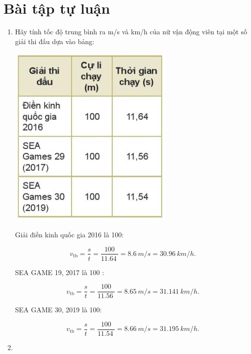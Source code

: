 \section{Bài tập tự luận}
\begin{enumerate}[label=\bfseries Bài \arabic*:]
	\item {}
	
	
	{
		Hãy tính tốc độ trung bình ra m/s và km/h của nữ vận động viên tại một số giải thi đấu dựa vào bảng:
		\begin{center}
			\includegraphics[scale=1]{../figs/VN10-2022-PH-TP005-5.jpg}
		\end{center}
	}
	\hideall
	{
		
		Giải điền kinh quốc  gia 2016 là 100:
		
		$$v_\text{tb} = \dfrac{s}{t} =\dfrac{100}{\SI{11,64}{}} = \SI{8,6}{m/s} = \SI{30,96}{km/h}.$$
		
		SEA GAME 19, 2017  là 100 : 
		
		$$v_\text{tb} = \dfrac{s}{t} =\dfrac{100}{\SI{11,56}{}} = \SI{8,65}{m/s} = \SI{31,141}{km/h}.$$
		
		SEA GAME 30, 2019 là 100: 
		
		$$v_\text{tb} = \dfrac{s}{t} =\dfrac{100}{\SI{11,54}{}}= \SI{8,66}{m/s} = \SI{31,195}{km/h}.$$
	}

	\item {}
	

\end{enumerate}
